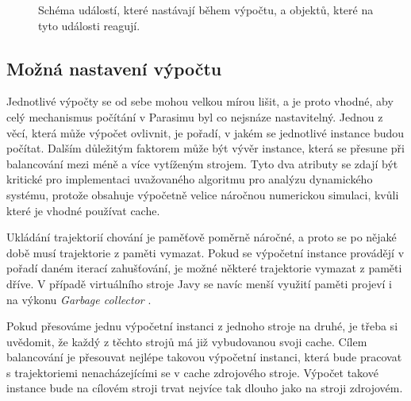 \begin{figure}[h!]
\begin{center}
{}
\end{center}
\caption{Schéma událostí, které nastávají během výpočtu, a objektů, které na tyto události reagují.}
\end{figure}

\subsection{Možná nastavení výpočtu}

Jednotlivé výpočty se od sebe mohou velkou mírou lišit, a je proto vhodné, aby celý mechanismus
počítání v Parasimu byl co nejsnáze nastavitelný. Jednou z věcí, která může výpočet ovlivnit, je pořadí,
v jakém se jednotlivé instance budou počítat. Dalším důležitým faktorem může být vývěr instance,
která se přesune při balancování mezi méně a více vytíženým strojem. Tyto dva atributy se zdají být
kritické pro implementaci uvažovaného algoritmu pro analýzu dynamického systému, protože obsahuje
výpočetně velice náročnou numerickou simulaci, kvůli které je vhodné používat cache.

Ukládání trajektorií chování je paměťově poměrně náročné, a proto se po nějaké době
musí trajektorie z paměti vymazat. Pokud se výpočetní instance pro\-vá\-dě\-jí v pořadí daném
iterací zahušťování, je možné některé trajektorie vymazat z paměti dříve. V případě virtuálního
stroje Javy se navíc menší využití paměti projeví i na výkonu \textit{Garbage collector} \cite{printezis2000}. 

Pokud přesováme jednu výpočetní instanci z jednoho stroje na druhé, je třeba si uvědomit,
že každý z těchto strojů má již vybudovanou svoji cache. Cílem balancování je přesouvat
nejlépe takovou výpočetní instanci, která bude pracovat s trajektoriemi nenacházejícími
se v cache zdrojového stroje. Výpočet takové instance bude na cílovém stroji trvat nejvíce tak dlouho jako
na stroji zdrojovém.

